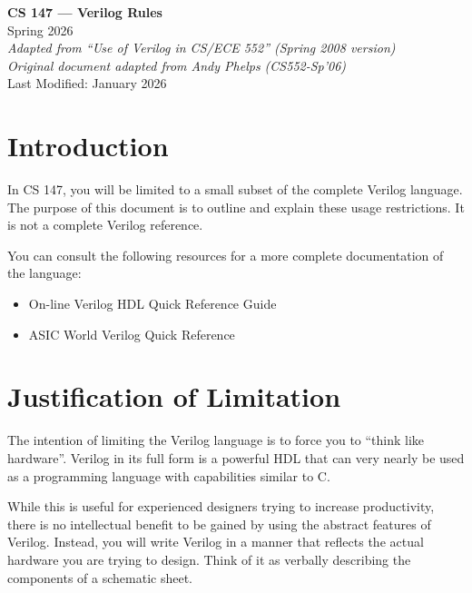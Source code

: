 \documentclass[11pt]{article}
\newcommand{\coursename}{CS 147}
\newcommand{\termname}{Spring 2026}
\begin{document}
\begin{center}
{\Large \textbf{\coursename{} — Verilog Rules}}\\[0.5em]
\termname\\[0.75em]
\textit{Adapted from ``Use of Verilog in CS/ECE 552'' (Spring 2008 version)}\\
\textit{Original document adapted from Andy Phelps (CS552-Sp'06)}\\
Last Modified: January 2026
\end{center}

\vspace{1.0em}

\tableofcontents
\newpage

\section{Introduction}

In \coursename{}, you will be limited to a small subset of the complete Verilog language.
The purpose of this document is to outline and explain these usage restrictions.
It is not a complete Verilog reference.

You can consult the following resources for a more complete documentation of the language:
\begin{itemize}
  \item On-line Verilog HDL Quick Reference Guide
  \item ASIC World Verilog Quick Reference
\end{itemize}

\section{Justification of Limitation}

The intention of limiting the Verilog language is to force you to ``think like hardware''.
Verilog in its full form is a powerful HDL that can very nearly be used as a programming language
with capabilities similar to C.

While this is useful for experienced designers trying to increase productivity, there is no
intellectual benefit to be gained by using the abstract features of Verilog. Instead, you will write
Verilog in a manner that reflects the actual hardware you are trying to design. Think of it as verbally
describing the components of a schematic sheet.
\end{document}
